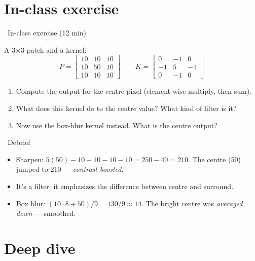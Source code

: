 \documentclass[10pt,aspectratio=169]{beamer}
\begin{document}
\section{In-class exercise}

\begin{frame}[fragile]{\faPen~In-class exercise (12 min)}
  \begin{infobox}
  \end{infobox}
  A 3$\times$3 patch and a kernel:
  \[
  P=\begin{bmatrix}10&10&10\\10&50&10\\10&10&10\end{bmatrix}\qquad
  K=\begin{bmatrix}0&-1&0\\-1&5&-1\\0&-1&0\end{bmatrix}
  \]
  \begin{enumerate}
    \item Compute the output for the centre pixel (element-wise multiply, then sum).
    \item What does this kernel do to the centre value? What kind of filter is it?
    \item Now use the box-blur kernel instead. What is the centre output?
  \end{enumerate}
\end{frame}

\begin{frame}{\faPen~Debrief}
  \begin{itemize}
    \item Sharpen: $5(50) - 10 - 10 - 10 - 10 = 250 - 40 = 210$. The centre (50) jumped to 210 — \emph{contrast boosted}.
    \item It's a  filter: it emphasizes the difference between centre and surround.
    \item Box blur: $(10{\cdot}8 + 50)/9 = 130/9 \approx 14$. The bright centre was \emph{averaged down} — smoothed.
  \end{itemize}
\end{frame}

\section{Deep dive}
\end{document}
